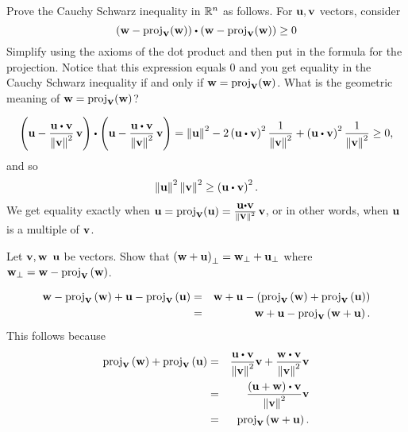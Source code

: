 \begin{enumialphparenastyle}
\begin{ex}
  Prove the Cauchy Schwarz inequality in $\mathbb{R}^{n}$ as follows.  For
  $\mbox{\bf u},\mbox{\bf v}$ vectors, consider
  \begin{equation*}
    \tup{\vect{w}-
      \func{proj}_{\vect{v}}(\vect{w})} \dotprod \tup{\vect{w}-
      \func{proj}_{\vect{v}}(\vect{w})} \geq 0
  \end{equation*}
  Simplify using the axioms of the dot product and then put in the
  formula for the projection. Notice that this expression equals $0$
  and you get equality in the Cauchy Schwarz inequality if and only if
  $\mbox{\bf w}=\mbox{\rm proj}_{\mbox{\bf v}}(\mbox{\bf w})$. What is the geometric
  meaning of $\mbox{\bf w}=\mbox{\rm proj}_{\mbox{\bf v}}(\mbox{\bf w})$?
  \begin{sol}
    \[
      \tup{\vect{u}-\frac{\vect{u}\dotprod \vect{v}}{\norm{\vect{v}}
          ^{2}}\,\vect{v}} \dotprod \tup{\vect{u}-\frac{\vect{u}\dotprod
          \vect{v}}{\norm{\vect{v}} ^{2}}\,\vect{v}} =\norm{\vect{u}}
      ^{2}-2\tup{\vect{u}\dotprod \vect{v}} ^{2}\frac{1}{\norm{
          \vect{v}} ^{2}}+\tup{\vect{u}\dotprod \vect{v}}
      ^{2}\frac{1}{ \norm{\vect{v}} ^{2}}\geq 0,
    \]
    and so
    \[
      \norm{\vect{u}} ^{2}\norm{\vect{v}}
      ^{2}\geq \tup{\vect{u}\dotprod \vect{v}} ^{2}.
    \]
    We get equality exactly when
    $\vect{u}=\func{proj}_{\vect{v}}(\vect{u}) =
    \frac{\vect{u}\dotprod \vect{v}}{\norm{\vect{v}} ^{2}}\,\vect{v}$,
    or in other words, when $\mbox{\bf u}$ is a multiple of $\mbox{\bf v}$.
  \end{sol}
\end{ex}


\begin{ex}\label{perp-linear}
  Let $\mbox{\bf v},\mbox{\bf w}$ $\mbox{\bf u}$ be vectors. Show that
  $\left(\mbox{\bf w}+\mbox{\bf u}\right) _{\perp }=\mbox{\bf w}_{\perp }+\mbox{\bf u}_{\perp
  }$ where
  $\mbox{\bf w}_{\perp }=\mbox{\bf w}-\mbox{\rm proj}_{\mbox{\bf v}}\left(\mbox{\bf w}\right)$.
  \begin{sol}
    \begin{eqnarray*}
      \mbox{\bf w}-\mbox{\rm proj}_{\mbox{\bf v}}\left(\mbox{\bf w}\right) +\mbox{\bf u}- \mbox{\rm proj}_{\mbox{\bf v}}\left(\mbox{\bf u}\right) 
      &=& \mbox{\bf w}+\mbox{\bf u}-\left(\mbox{\rm proj}_{\mbox{\bf v}}\left(\mbox{\bf w}\right) +\mbox{\rm proj}_{\mbox{\bf v}}\left(\mbox{\bf u}\right) \right) \\
      &=&\mbox{\bf w}+\mbox{\bf u}-\mbox{\rm proj}_{\mbox{\bf v}}\left(\mbox{\bf w}+\mbox{\bf u}\right).
    \end{eqnarray*}
    This follows because 
    \begin{eqnarray*}
      \func{proj}_{\vect{v}}\tup{\vect{w}} +\func{proj}_{\vect{v}}\tup{
      \vect{u}}
      &=& \frac{\vect{u}\dotprod \vect{v}}{\norm{\vect{v}} ^{2}}\vect{v}+
          \frac{\vect{w}\dotprod \vect{v}}{\norm{\vect{v}} ^{2}}\vect{v} \\
      &=& \frac{\tup{\vect{u}+\vect{w}} \dotprod \vect{v}}{\norm{\vect{v}
          } ^{2}}\vect{v} \\
      &=& \func{proj}_{\vect{v}}\tup{\vect{w}+\vect{u}}.
    \end{eqnarray*}
  \end{sol}
\end{ex}


\end{enumialphparenastyle}
